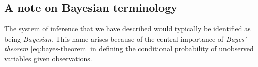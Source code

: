 
 
\subsection{A note on Bayesian terminology}






The system of inference that we have described would typically be identified as being \emph{Bayesian}. This name arises because of the central importance of \emph{Bayes' theorem} \eqref{eq:bayes-theorem} in defining the conditional probability of unobserved variables given observations.

